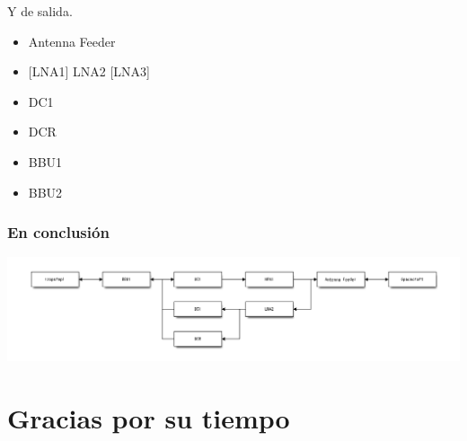 \documentclass[11pt]{article}
\providecommand{\tightlist}{%
      \setlength{\itemsep}{0pt}\setlength{\parskip}{0pt}}
\begin{document}
    Y de salida.

    \begin{itemize}
\tightlist
\item
  Antenna Feeder
\end{itemize}

    \begin{itemize}
\tightlist
\item
  {[}LNA1{]} LNA2 {[}LNA3{]}
\end{itemize}

    \begin{itemize}
\tightlist
\item
  DC1
\item
  DCR
\end{itemize}

    \begin{itemize}
\tightlist
\item
  BBU1
\item
  BBU2
\end{itemize}

    \hypertarget{en-conclusiuxf3n}{%
\subsubsection{En conclusión}\label{en-conclusiuxf3n}}

    \includegraphics{./diagrams/diagrama_mx3.png}

    \hypertarget{gracias-por-su-tiempo}{%
\section{Gracias por su tiempo}\label{gracias-por-su-tiempo}}


\end{document}
